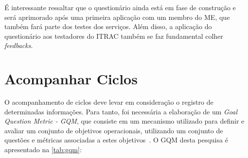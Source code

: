 É interessante ressaltar que o questionário ainda está em fase de construção e será aprimorado após uma primeira aplicação com um membro do ME, que também fará parte dos testes dos serviços. Além disso, a aplicação do questionário aos testadores do ITRAC também se faz fundamental colher \textit{feedbacks}.

\section{Acompanhar Ciclos}
\label{sec:acompanhar_ciclos}

O acompanhamento de ciclos deve levar em consideração o registro de determinadas informações. Para tanto, foi necessária a elaboração de um \textit{Goal Question Metric - GQM}, que consiste em um mecanismo utilizado para definir e avaliar um conjunto de objetivos operacionais, utilizando um conjunto de questões e métricas associadas a estes objetivos~\cite{basili1994goal}. O GQM desta pesquisa é apresentado na \ref{tab:gqm}: 

